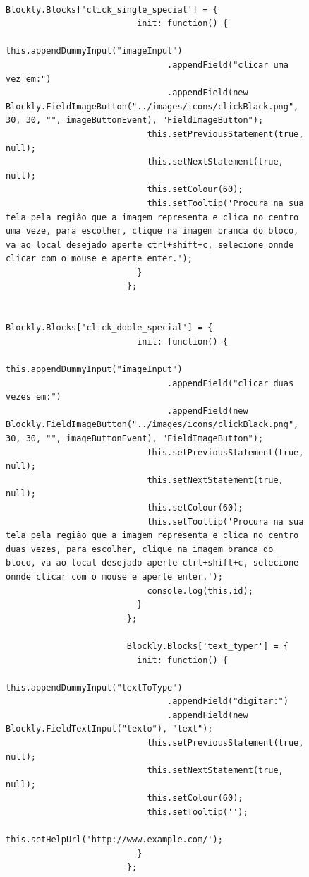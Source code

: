 \documentclass[tg]{mdtufsm}
\begin{document}
                    \begin{figure}[!htb]
                    \begin{lstlisting}
                        Blockly.Blocks['click_single_special'] = {
                          init: function() {
                            this.appendDummyInput("imageInput")
                                .appendField("clicar uma vez em:")
                                .appendField(new Blockly.FieldImageButton("../images/icons/clickBlack.png", 30, 30, "", imageButtonEvent), "FieldImageButton");
                            this.setPreviousStatement(true, null);
                            this.setNextStatement(true, null);
                            this.setColour(60);
                            this.setTooltip('Procura na sua tela pela região que a imagem representa e clica no centro uma veze, para escolher, clique na imagem branca do bloco, va ao local desejado aperte ctrl+shift+c, selecione onnde clicar com o mouse e aperte enter.');
                          }
                        };

                        Blockly.Blocks['click_doble_special'] = {
                          init: function() {
                            this.appendDummyInput("imageInput")
                                .appendField("clicar duas vezes em:")
                                .appendField(new Blockly.FieldImageButton("../images/icons/clickBlack.png", 30, 30, "", imageButtonEvent), "FieldImageButton");
                            this.setPreviousStatement(true, null);
                            this.setNextStatement(true, null);
                            this.setColour(60);
                            this.setTooltip('Procura na sua tela pela região que a imagem representa e clica no centro duas vezes, para escolher, clique na imagem branca do bloco, va ao local desejado aperte ctrl+shift+c, selecione onnde clicar com o mouse e aperte enter.');
                            console.log(this.id);
                          }
                        };

                        Blockly.Blocks['text_typer'] = {
                          init: function() {
                            this.appendDummyInput("textToType")
                                .appendField("digitar:")
                                .appendField(new Blockly.FieldTextInput("texto"), "text");
                            this.setPreviousStatement(true, null);
                            this.setNextStatement(true, null);
                            this.setColour(60);
                            this.setTooltip('');
                            this.setHelpUrl('http://www.example.com/');
                          }
                        };


\end{lstlisting}
\end{figure}
\end{document}
